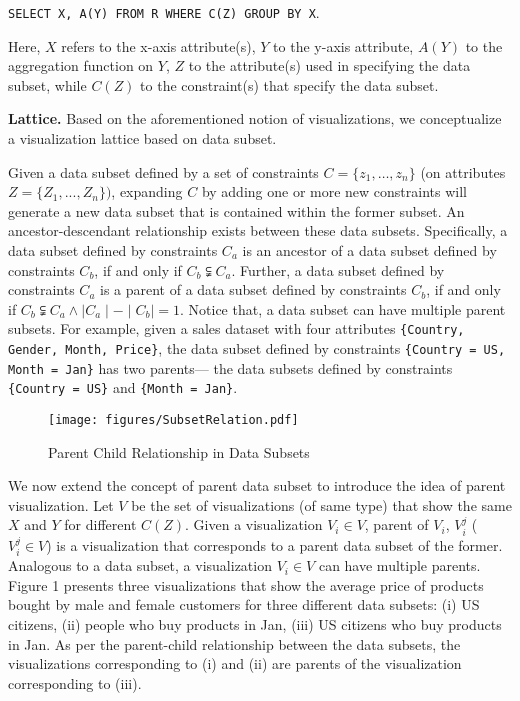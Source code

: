 \begin{center}
{\tt SELECT X, A(Y) FROM R WHERE C(Z) GROUP BY X}.
\end{center}

Here, $X$ refers to the x-axis attribute(s), $Y$ to the y-axis attribute, $A(Y)$ to the aggregation function on $Y$, $Z$ to the attribute(s) used in specifying the data subset, while $C(Z)$ to the constraint(s) that specify the data subset.

\textbf{Lattice.} Based on the aforementioned notion of visualizations, we conceptualize a visualization lattice based on data subset. 

Given a data subset defined by a set of constraints $C = \{z_1, \ldots, z_n\}$ (on attributes $Z = \{Z_1, ..., Z_n\})$, expanding $C$ by adding one or more new constraints will generate a new data subset that is contained within the former subset. An ancestor-descendant relationship exists between these data subsets. Specifically, a data subset defined by constraints $C_a$ is an ancestor of a data subset defined by constraints $C_b$, if and only if $C_b \subsetneqq C_a$. Further, a data subset defined by constraints $C_a$ is a parent of a data subset defined by constraints $C_b$, if and only if $C_b \subsetneqq C_a \land \mid C_a \mid - \mid C_b \mid = 1$. Notice that, a data subset can have multiple parent subsets. For example, given a sales dataset with four attributes {\tt\{Country, Gender, Month, Price\}}, the data subset defined by constraints {\tt\{Country = US, Month = Jan\}} has two parents--- the data subsets defined by constraints {\tt\{Country = US\}} and {\tt\{Month = Jan\}}.

\begin{figure}[bht]
\label{example}
\centering
\texttt{[image: figures/SubsetRelation.pdf]}
\caption{Parent Child Relationship in Data Subsets}
\end{figure}

We now extend the concept of parent data subset to introduce the idea of parent visualization. Let $V$ be the set of visualizations (of same type) that show the same $X$ and $Y$ for different $C(Z)$. Given a visualization $V_i \in V$, parent of $V_i$, $V_i^j$ ($V_i^j\in V$) is a visualization that corresponds to a parent data subset of the former. Analogous to a data subset, a visualization $V_i \in V$ can have multiple parents. Figure 1 presents three visualizations that show the average price of products bought by male and female customers for three different data subsets: (i) US citizens, (ii) people who buy products in Jan, (iii) US citizens who buy products in Jan. As per the parent-child relationship between the data subsets, the visualizations corresponding to (i) and (ii) are parents of the visualization corresponding to (iii).

